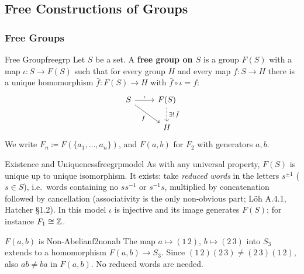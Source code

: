 \newpage

\subsection{Free Constructions of Groups}


\subsubsection{Free Groups}

\begin{definition}{Free Group}{freegrp}
  Let $S$ be a set. A \textbf{free group on $S$} is a group $F(S)$ with a map $\iota:S\to F(S)$ such that for every group $H$ and every map $f:S\to H$ there is a unique homomorphism $\bar f:F(S)\to H$ with $\bar f\circ\iota=f$:
  \[
  \begin{tikzcd}
    S \ar[r, "\iota"] \ar[dr, "f"'] & F(S) \ar[d, dashed, "\exists!\,\bar f"] \\
    & H
  \end{tikzcd}
  \]
  We write $F_n\coloneq F(\{a_1,\dots,a_n\})$, and $F(a,b)$ for $F_2$ with generators $a,b$.
\end{definition}

\begin{remark}{Existence and Uniqueness}{freegrpmodel}
  As with any universal property, $F(S)$ is unique up to unique isomorphism. It exists: take \emph{reduced words} in the letters $s^{\pm1}$ ($s\in S$), i.e.\ words containing no $ss^{-1}$ or $s^{-1}s$, multiplied by concatenation followed by cancellation (associativity is the only non-obvious part; Löh A.4.1, Hatcher §1.2). In this model $\iota$ is injective and its image generates $F(S)$; for instance $F_1\cong\mathbb{Z}$.
\end{remark}

\begin{example}{$F(a,b)$ is Non-Abelian}{f2nonab}
  The map $a\mapsto(1\,2)$, $b\mapsto(2\,3)$ into $S_3$ extends to a homomorphism $F(a,b)\to S_3$. Since $(1\,2)(2\,3)\neq(2\,3)(1\,2)$, also $ab\neq ba$ in $F(a,b)$. No reduced words are needed.
\end{example}


